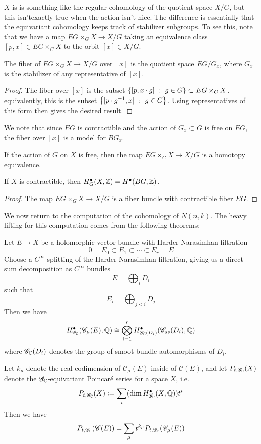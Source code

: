 $X$ is is something like the regular cohomology of the quotient space $X/G$, but
this isn'texactly true when the action isn't nice. The difference is essentially
that the equivariant cohomology keeps track of stabilizer subgroups. To
see this, note that we have a map $EG\times_G X \to X/G$ taking an
equivalence class $[p,x] \in EG\times_G X$ to the orbit $[x] \in X/G$.
%
\begin{prop}
The fiber of $EG\times_G X \to X/G$ over $[x]$ is the quotient space $EG/G_x$, where
$G_x$ is the stabilizer of any representative of $[x]$.
\end{prop}
%
\begin{proof}
The fiber over $[x]$ is the subset $\left\lbrace [p,x\cdot g] ~:~ g \in G \right\rbrace\subset EG \times_G X$.
equivalently, this is the subset $\left\lbrace [p\cdot g^{-1},x] ~:~ g \in G \right\rbrace$. Using
representatives of this form then gives the desired result.
\end{proof}
%
We note that since $EG$ is contractible and the action of $G_x \subset G$
is free on $EG$, the fiber over $[x]$ is a model for $BG_x$.
%
\begin{cor}
If the action of $G$ on $X$ is free, then the map $EG\times_G X \to X/G$
is a homotopy equivalence.
\end{cor}
%
\begin{cor}
If $X$ is contractible, then $H^\bullet_G(X,\mathbb{Z}) = H^\bullet(BG,\mathbb{Z})$.
\end{cor}
%
\begin{proof}
The map $EG\times_G X \to X/G$ is a fiber bundle with contractible fiber $EG$.
\end{proof}
%
We now return to the computation of the cohomology of $N(n,k)$. The heavy
lifting for this computation comes from the following theorems:
%
\begin{thm}
Let $E \to X$ be a holomorphic vector bundle with Harder-Narasimhan filtration
\[
0 = E_0 \subset E_1 \subset \cdots \subset E_r = E
\]
Choose a $C^\infty$ splitting of the Harder-Narasimhan filtration, giving us a direct
sum decomposition as $C^\infty$ bundles
\[
E = \bigoplus_i D_i
\]
such that
\[
E_i = \bigoplus_{j < i} D_j
\]
Then we have
\[
H^\bullet_{\mathscr{G}_{\mathbb{C}}}(\mathscr{C}_\mu(E),\mathbb{Q}) \cong
\bigotimes_{i=1}^r H^\bullet_{\mathscr{G}_{\mathbb{C}}(D_i)}(\mathscr{C}_{ss}(D_i),\mathbb{Q})
\]
where $\mathscr{G}_{\mathbb{C}}(D_i)$ denotes the group of smoot bundle automorphisms of $D_i$.
\end{thm}
%
\begin{thm}
Let $k_\mu$ denote the real codimension of $\mathscr{C}_\mu(E)$ inside
of $\mathscr{C}(E)$, and let $P_{t,\mathscr{G}_{\mathbb{C}}}(X)$ denote the
$\mathscr{G}_{\mathbb{C}}$-equivariant Poincar\'e series for a space $X$, i.e.
\[
P_{t,\mathscr{G}_{\mathbb{C}}}(X) \vcentcolon= \sum_i (\dim H^\bullet_{\mathscr{G}_{\mathbb{C}}}(X,\mathbb{Q}))t^i
\]
Then we have
\[
P_{t,\mathscr{G}_{\mathbb{C}}}(\mathscr{C}(E))
= \sum_\mu t^{k_\mu}P_{t,\mathscr{G}_{\mathbb{C}}}(\mathscr{C}_\mu(E))
\]
\end{thm}
